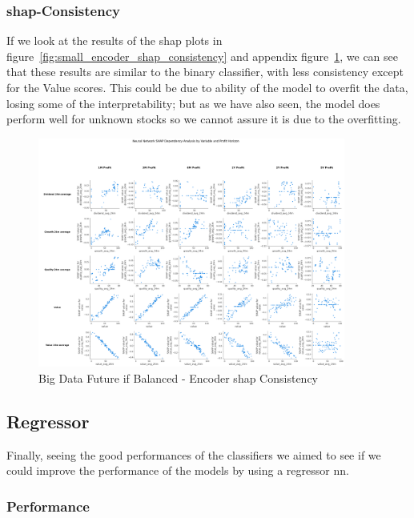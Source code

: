 \documentclass[11pt,english,a4paper,hidelinks]{book}
\begin{document}
\subsubsection{\acrshort{shap}-Consistency}

If we look at the results of the \gls{shap} plots in figure~\ref{fig:small_encoder_shap_consistency} and appendix figure~\ref{fig:big_encoder_shap_consistency}, we can see that these results are similar to the binary classifier, with less consistency except for the Value scores. This could be due to ability of the model to overfit the data, losing some of the interpretability; but as we have also seen, the model does perform well for unknown stocks so we cannot assure it is due to the overfitting.

\begin{figure}[H]
    \centering
    \includegraphics[width=0.9\textwidth]{images/code/models/neural_network/binary_classifier_nn/Big Data future - IF HARD Balanced/shap_table_analysis.png}
    \caption{Big Data Future \acrshort{if} Balanced - Encoder \gls{shap} Consistency}
    \label{fig:big_encoder_shap_consistency}
\end{figure}

\subsection{Regressor}

\noindent Finally, seeing the good performances of the classifiers we aimed to see if we could improve the performance of the models by using a regressor \acrshort{nn}.

\subsubsection{Performance}
\end{document}
